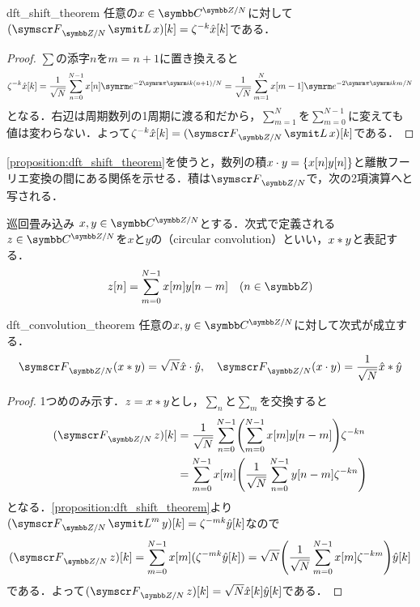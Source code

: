 \documentclass[../../main]{subfiles}
\begin{document}
\begin{proposition}{}{dft_shift_theorem}
  任意の\(x\in\cycles{\numset{C}}{N}\)に対して\((\dft{N}\lagop x)[k]=\zeta^{-k}\hat{x}[k]\)である．
\end{proposition}

\begin{proof}
  \(\sum\)の添字\(n\)を\(m=n+1\)に置き換えると
  \[
    \zeta^{-k}\hat{x}[k] = \frac{1}{\sqrt{N}}\sum_{n=0}^{N-1}x[n]\napr^{-2\krez\iuni k(n+1)/N}
    = \frac{1}{\sqrt{N}}\sum_{m=1}^Nx[m-1]\napr^{-2\krez\iuni km/N}
  \]
  となる．右辺は周期数列の1周期に渡る和だから，\(\sum_{m=1}^N\)を\(\sum_{m=0}^{N-1}\)に変えても値は変わらない．よって\(\zeta^{-k}\hat{x}[k]=(\dft{N}\lagop x)[k]\)である．
\end{proof}

\cref{proposition:dft_shift_theorem}を使うと，数列の積\(x\cdot y=\lbrace x[n]y[n]\rbrace\)と離散フーリエ変換の間にある関係を示せる．積は\(\dft{N}\)で，次の2項演算へと写される．

\begin{definition}{巡回畳み込み}{}
  \(x,y\in\cycles{\numset{C}}{N}\)とする．次式で定義される\(z\in\cycles{\numset{C}}{N}\)を\(x\)と\(y\)の（circular convolution）といい，\(x\ast y\)と表記する．
  \[
    z[n] = \sum_{m=0}^{N-1}x[m]y[n-m]\quad(n\in\numset{Z})
  \]
\end{definition}

\begin{proposition}{}{dft_convolution_theorem}
  任意の\(x,y\in\cycles{\numset{C}}{N}\)に対して次式が成立する．
  \[
    \dft{N}(x\circconv y) = \sqrt{N}\hat{x}\cdot\hat{y},
    \quad\dft{N}(x\cdot y) = \frac{1}{\sqrt{N}}\hat{x}\circconv\hat{y}
  \]
\end{proposition}

\begin{proof}
  1つめのみ示す．\(z=x\ast y\)とし，\(\sum_n\)と\(\sum_m\)を交換すると
  \begin{align*}
    (\dft{N}z)[k] &= \frac{1}{\sqrt{N}}\sum_{n=0}^{N-1}\pqty*{\sum_{m=0}^{N-1}x[m]y[n-m]}\zeta^{-kn} \\
    &= \sum_{m=0}^{N-1}x[m]\pqty*{\frac{1}{\sqrt{N}}\sum_{n=0}^{N-1}y[n-m]\zeta^{-kn}}
  \end{align*}
  となる．\cref{proposition:dft_shift_theorem}より\((\dft{N}\lagop^my)[k]=\zeta^{-mk}\hat{y}[k]\)なので
  \[
    (\dft{N}z)[k] = \sum_{m=0}^{N-1}x[m](\zeta^{-mk}\hat{y}[k])
    = \sqrt{N}\pqty*{\frac{1}{\sqrt{N}}\sum_{m=0}^{N-1}x[m]\zeta^{-km}}\hat{y}[k]
  \]
  である．よって\((\dft{N}z)[k]=\sqrt{N}\hat{x}[k]\hat{y}[k]\)である．
\end{proof}
\end{document}
